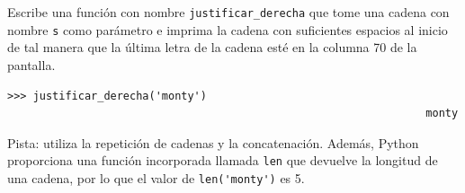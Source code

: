 \documentclass[10pt]{book}
\begin{document}
\begin{exercise}

Escribe una función con nombre \verb"justificar_derecha" que tome una cadena
con nombre {\tt s} como parámetro e imprima la cadena con suficientes
espacios al inicio de tal manera que la última letra de la cadena esté en la columna 70
de la pantalla.

\begin{verbatim}
>>> justificar_derecha('monty')
                                                                 monty
\end{verbatim}

Pista: utiliza la repetición de cadenas y la concatenación.  Además,
Python proporciona una función incorporada llamada {\tt len} que
devuelve la longitud de una cadena, por lo que el valor de \verb"len('monty')" es 5.

\end{exercise}
\end{document}
